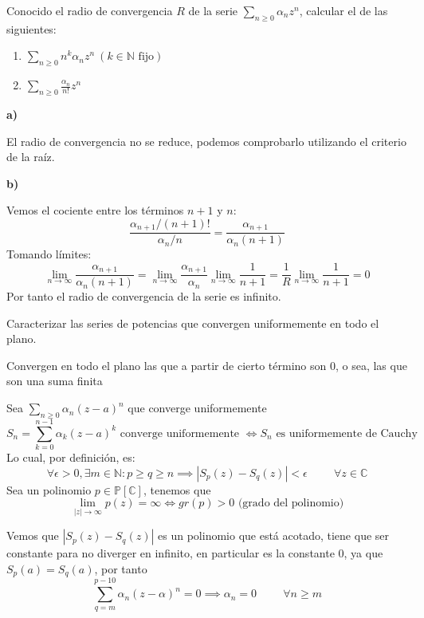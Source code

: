 \begin{ejer}
	Conocido el radio de convergencia $R$ de la serie $\sum_{n\geq 0} \alpha_nz^n$, calcular el de las siguientes:
	\begin{enumerate}[label=(\alph*)]
		\item $\sum_{n\geq 0} n^k\alpha_nz^n \ (k\in\mathbb{N} \text{ fijo})$
		\item $\sum_{n\geq0} \frac{\alpha_n}{n!}z^n$	
	\end{enumerate}
\end{ejer}
\begin{sol}
	
	\textbf{a)}
	
	El radio de convergencia no se reduce, podemos comprobarlo utilizando el criterio de la raíz.
	
	\textbf{b)}
	
	Vemos el cociente entre los términos $n+1$ y $n$:
	$$ \frac{\alpha_{n+1}/(n+1)!}{\alpha_n/n} = \frac{\alpha_{n+1}}{\alpha_n (n+1)}$$
	Tomando límites:
	$$ \lim_{n\rightarrow\infty} \frac{\alpha_{n+1}}{\alpha_n (n+1)} = \lim_{n\rightarrow\infty}\frac{\alpha_{n+1}}{\alpha_n}\lim_{n\rightarrow\infty}\frac{1}{n+1} = \frac{1}{R} \lim_{n\rightarrow\infty}\frac{1}{n+1} = 0$$
	Por tanto el radio de convergencia de la serie es infinito.
\end{sol}

\begin{ejer}
	Caracterizar las series de potencias que convergen uniformemente en todo el plano.
\end{ejer}
\begin{sol}
	
	Convergen en todo el plano las que a partir de cierto término son 0, o sea, las que son una suma finita
	
	Sea $\sum_{n\geq 0} \alpha_n (z-a)^n$ que converge uniformemente
	$$S_n=\sum_{k=0}^{n-1} \alpha_k (z-a)^k \text{ \ converge uniformemente } \Longleftrightarrow S_n \text{ es uniformemente de Cauchy }$$
	Lo cual, por definición, es:
	$$\forall\epsilon>0,\exists m\in\mathbb{N}: p\geq q\geq n \implies |S_p(z)-S_q(z)| < \epsilon \hspace{1cm}\forall z\in\mathbb{C}$$
	Sea un polinomio $p\in\mathbb{P}[\mathbb{C}]$, tenemos que $$\lim_{|z|\rightarrow\infty} p(z) = \infty \Longleftrightarrow gr(p)>0 \text{ (grado del polinomio)}$$
	
	Vemos que $|S_p(z)-S_q(z)|$ es un polinomio que está acotado, tiene que ser constante para no diverger en infinito, en particular es la constante $0$, ya que $S_p(a)=S_q(a)$, por tanto $$\sum_{q=m}^{p-10} \alpha_n (z-\alpha)^n = 0 \implies  \alpha_n=0 \hspace{1cm}\forall n\geq m$$ %
	
\end{sol}


